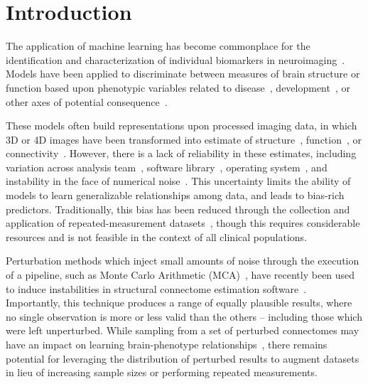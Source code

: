 \documentclass[10pt]{SelfArx} %
\affiliation{\textsuperscript{1}\textit{Montréal Neurological Institute, McGill University, Montréal, QC, Canada}}
\affiliation{\textsuperscript{2}\textit{Department of Computer Science and Software Engineering, Concordia University, Montréal, QC, Canada}}
\begin{document}
\flushbottom %
\maketitle %
\thispagestyle{empty} %

\pagestyle{fancy}
\section*{Introduction}

The application of machine learning has become commonplace for the identification and characterization of individual
biomarkers in neuroimaging~\cite{woo2017building}. Models have been applied to discriminate between measures of brain
structure or function based upon phenotypic variables related to
disease~\cite{Crossley2014-tg,Payabvash2019-tm,Tolan2018-nq}, development~\cite{Zhang2019-ko}, or other axes of
potential consequence~\cite{Zhu2018-cs,Park2015-uj}.

These models often build representations upon processed imaging data, in which 3D or 4D images have been transformed
into estimate of structure~\cite{wade2017machine}, function~\cite{weis2020sex}, or
connectivity~\cite{munsell2015evaluation}. However, there is a lack of reliability in these estimates, including
variation across analysis team~\cite{botvinik2020variability}, software library~\cite{bowring2019exploring}, operating
system~\cite{salari2020file}, and instability in the face of numerical noise~\cite{Kiar2020-kz}. This uncertainty
limits the ability of models to learn generalizable relationships among data, and leads to bias-rich predictors.
Traditionally, this bias has been reduced through the collection and application of repeated-measurement
datasets~\cite{sudlow2015uk,zuo2014open}, though this requires considerable resources and is not feasible in the
context of all clinical populations.

Perturbation methods which inject small amounts of noise through the execution of a pipeline, such as Monte Carlo
Arithmetic (MCA)~\cite{Parker1997-qq,Denis2016-wo}, have recently been used to induce instabilities in structural
connectome estimation software~\cite{Kiar2020-lb}. Importantly, this technique produces a range of equally plausible
results, where no single observation is more or less valid than the others – including those which were left
unperturbed. While sampling from a set of perturbed connectomes may have an impact on learning brain-phenotype
relationships~\cite{Kiar2020-kz}, there remains potential for leveraging the distribution of perturbed results to
augment datasets in lieu of increasing sample sizes or performing repeated measurements.
\end{document}
